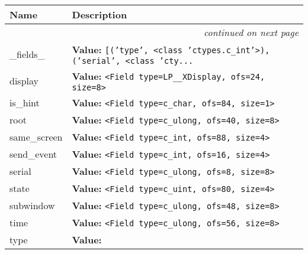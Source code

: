     \vspace{-1cm}
\hspace{\varindent}\begin{longtable}{|p{\varnamewidth}|p{\vardescrwidth}|l}
\cline{1-2}
\cline{1-2} \centering \textbf{Name} & \centering \textbf{Description}& \\
\cline{1-2}
\endhead\cline{1-2}\multicolumn{3}{r}{\small\textit{continued on next page}}\\\endfoot\cline{1-2}
\endlastfoot\raggedright \_\-f\-i\-e\-l\-d\-s\-\_\- & \raggedright \textbf{Value:} 
{\tt \texttt{[}\texttt{(}\texttt{'}\texttt{type}\texttt{'}\texttt{, }{\textless}class 'ctypes.c\_int'{\textgreater}\texttt{)}\texttt{, }\texttt{(}\texttt{'}\texttt{serial}\texttt{'}\texttt{, }{\textless}class 'cty\texttt{...}}&\\
\cline{1-2}
\raggedright d\-i\-s\-p\-l\-a\-y\- & \raggedright \textbf{Value:} 
{\tt {\textless}Field type=LP\_\_XDisplay, ofs=24, size=8{\textgreater}}&\\
\cline{1-2}
\raggedright i\-s\-\_\-h\-i\-n\-t\- & \raggedright \textbf{Value:} 
{\tt {\textless}Field type=c\_char, ofs=84, size=1{\textgreater}}&\\
\cline{1-2}
\raggedright r\-o\-o\-t\- & \raggedright \textbf{Value:} 
{\tt {\textless}Field type=c\_ulong, ofs=40, size=8{\textgreater}}&\\
\cline{1-2}
\raggedright s\-a\-m\-e\-\_\-s\-c\-r\-e\-e\-n\- & \raggedright \textbf{Value:} 
{\tt {\textless}Field type=c\_int, ofs=88, size=4{\textgreater}}&\\
\cline{1-2}
\raggedright s\-e\-n\-d\-\_\-e\-v\-e\-n\-t\- & \raggedright \textbf{Value:} 
{\tt {\textless}Field type=c\_int, ofs=16, size=4{\textgreater}}&\\
\cline{1-2}
\raggedright s\-e\-r\-i\-a\-l\- & \raggedright \textbf{Value:} 
{\tt {\textless}Field type=c\_ulong, ofs=8, size=8{\textgreater}}&\\
\cline{1-2}
\raggedright s\-t\-a\-t\-e\- & \raggedright \textbf{Value:} 
{\tt {\textless}Field type=c\_uint, ofs=80, size=4{\textgreater}}&\\
\cline{1-2}
\raggedright s\-u\-b\-w\-i\-n\-d\-o\-w\- & \raggedright \textbf{Value:} 
{\tt {\textless}Field type=c\_ulong, ofs=48, size=8{\textgreater}}&\\
\cline{1-2}
\raggedright t\-i\-m\-e\- & \raggedright \textbf{Value:} 
{\tt {\textless}Field type=c\_ulong, ofs=56, size=8{\textgreater}}&\\
\cline{1-2}
\raggedright t\-y\-p\-e\- & \raggedright \textbf{Value:} 

\end{longtable}
